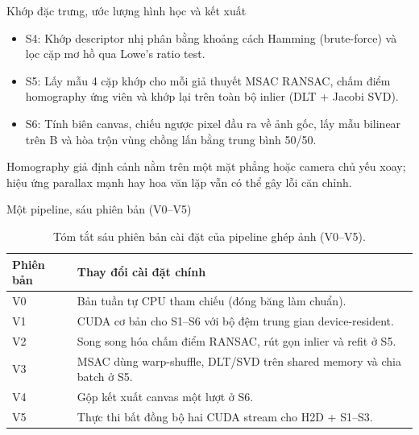 \documentclass[aspectratio=169]{beamer}
\begin{document}
\begin{frame}{Khớp đặc trưng, ước lượng hình học và kết xuất}
\begin{itemize}
\item S4: Khớp descriptor nhị phân bằng khoảng cách Hamming (brute-force) và lọc cặp mơ hồ qua Lowe's ratio test.
\item S5: Lấy mẫu 4 cặp khớp cho mỗi giả thuyết MSAC RANSAC, chấm điểm homography ứng viên và khớp lại trên toàn bộ inlier (DLT + Jacobi SVD).
\item S6: Tính biên canvas, chiếu ngược pixel đầu ra về ảnh gốc, lấy mẫu bilinear trên B và hòa trộn vùng chồng lấn bằng trung bình 50/50.
\end{itemize}
\medskip
\small Homography giả định cảnh nằm trên một mặt phẳng hoặc camera chủ yếu xoay; hiệu ứng parallax mạnh hay hoa văn lặp vẫn có thể gây lỗi căn chỉnh.
\end{frame}

\begin{frame}{Một pipeline, sáu phiên bản (V0--V5)}
\begin{table}
\centering
\caption{Tóm tắt sáu phiên bản cài đặt của pipeline ghép ảnh (V0--V5).}
\begin{tabular}{lp{.71\linewidth}}
\toprule
Phiên bản & Thay đổi cài đặt chính \\
\midrule
V0 & Bản tuần tự CPU tham chiếu (đóng băng làm chuẩn). \\
V1 & CUDA cơ bản cho S1--S6 với bộ đệm trung gian device-resident. \\
V2 & Song song hóa chấm điểm RANSAC, rút gọn inlier và refit ở S5. \\
V3 & MSAC dùng warp-shuffle, DLT/SVD trên shared memory và chia batch ở S5. \\
V4 & Gộp kết xuất canvas một lượt ở S6. \\
V5 & Thực thi bất đồng bộ hai CUDA stream cho H2D + S1--S3. \\
\bottomrule
\end{tabular}
\end{table}
\end{frame}
\end{document}
